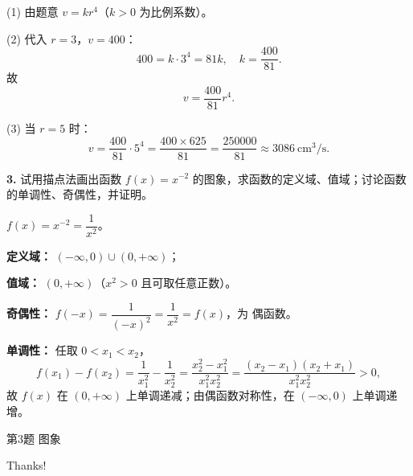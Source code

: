 \documentclass[10pt,aspectratio=169,serif,fleqn]{beamer}
\begin{document}
\begin{frame}[t]{}\vspace{-1em}
\begin{tcolorbox}[colback=orange!10,colframe=orange,title=\textbf{解}]
(1) 由题意 $v=kr^4$（$k>0$ 为比例系数）。

\vspace{0.5em}
(2) 代入 $r=3$，$v=400$：
\[
400=k\cdot 3^4=81k,\quad k=\frac{400}{81}.
\]
故
\[
v=\frac{400}{81}r^4.
\]

\vspace{0.5em}
(3) 当 $r=5$ 时：
\[
v=\frac{400}{81}\cdot 5^4=\frac{400\times 625}{81}=\frac{250000}{81}\approx 3086\ \text{cm}^3/\text{s}.
\]
\end{tcolorbox}
\end{frame}

\begin{frame}[t]{\textbf{3.} 试用描点法画出函数 $f(x)=x^{-2}$ 的图象，求函数的定义域、值域；讨论函数的单调性、奇偶性，并证明。}
	\vspace{-2em}
\begin{tcolorbox}[colback=orange!10,colframe=orange,title=\textbf{解}]
	$f(x)=x^{-2}=\dfrac{1}{x^2}$。
	
	\vspace{0.3em}
	\textbf{定义域：} $(-\infty,0)\cup(0,+\infty)$；
	
	\textbf{值域：} $(0,+\infty)$（$x^2>0$ 且可取任意正数）。
	
	\vspace{0.5em}
	\textbf{奇偶性：} $f(-x)=\dfrac{1}{(-x)^2}=\dfrac{1}{x^2}=f(x)$，为 \alert{偶函数}。
	
	\vspace{0.5em}
	\textbf{单调性：} 任取 $0<x_1<x_2$，
	\[
	f(x_1)-f(x_2)=\frac1{x_1^2}-\frac1{x_2^2}=\frac{x_2^2-x_1^2}{x_1^2x_2^2}=\frac{(x_2-x_1)(x_2+x_1)}{x_1^2x_2^2}>0,
	\]
	故 $f(x)$ 在 $(0,+\infty)$ 上单调递减；由偶函数对称性，在 $(-\infty,0)$ 上单调递增。
\end{tcolorbox}
\end{frame}



\begin{frame}[t]{第3题 图象}
\begin{center}
\end{center}
\end{frame}

\begin{frame}[c]
  \begin{center}
    {\Huge\calligra Thanks!}
  \end{center}
\end{frame}
\end{document}
